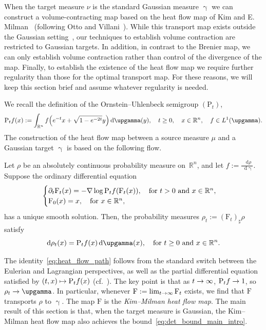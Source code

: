 \documentclass[10pt]{amsart}
\theoremstyle{definition}\newtheorem{defi}[theo]{Definition}\newtheorem{rema}[theo]{Remark}\newtheorem{exam}[theo]{Example}\newtheorem{exem}[theo]{Example}\newtheorem{nota}[theo]{Notation}
\newcommand{\R}{\mathbb R}
\newcommand{\Pheat}{\mathrm{P}}
\newcommand{\KM}{\mathrm F}
\newcommand{\dd}{n}
\newcommand{\density}{f}
\newcommand{\prob}{\rho}
\newcommand{\source}{\mu}
\newcommand{\target}{\nu}
\newcommand*\diff{\mathop{}\!\mathrm{d}}
\newcommand{\Gaussian}{\upgamma}
\renewcommand*{\to}{\mathchoice{\longrightarrow}{\rightarrow}{\rightarrow}{\rightarrow}}
\let\oldmapsto\mapsto
\renewcommand*{\mapsto}{\mathchoice{\longmapsto}{\oldmapsto}{\oldmapsto}{\oldmapsto}}
\let\originalleft\left
\let\originalright\right
\renewcommand{\left}{\mathopen{}\mathclose\bgroup\originalleft}
\renewcommand{\right}{\aftergroup\egroup\originalright}
\let\oldin\in
\renewcommand{\in}{\mathchoice{\oldin}{\oldin}{\,\oldin\,}{\,\oldin\,}}
\begin{document}
When the target measure $\target$ is the standard Gaussian measure $\Gaussian$ we can construct a volume-contracting map based on the heat flow map of Kim and E. Milman~\cite{MR2983070} (following Otto and Villani~\cite{MR1760620}). While this transport map exists outside the Gaussian setting~\cite{MR2983070,MR4707029}, our techniques to establish volume contraction are restricted to Gaussian targets. In addition, in contrast to the Brenier map, we can only establish volume contraction rather than control of the divergence of the map. Finally, to establish the existence of the heat flow map we require further regularity than those for the optimal transport map. For these reasons, we will keep this section brief and assume whatever regularity is needed.

We recall the definition of the Ornstein--Uhlenbeck semigroup $(\Pheat_t)$,
\begin{equation}\label{eq:OU_def}
\Pheat_t\density(x):=\int_{\R^{\dd}} \density\left(e^{-t}x+\sqrt{1-e^{-2t}}y\right)\diff \Gaussian(y),\quad t\ge 0,\quad x\in \R^{\dd}, \quad \density \in L^1(\Gaussian).
\end{equation}
The construction of the heat flow map between a source measure $\source$ and a Gaussian target $\Gaussian$ is based on the following flow.
\begin{prop}\label{prop:KM_construction}
Let $\prob$ be an absolutely continuous probability measure on~$\R^{\dd}$, and let $\density:=\frac{\diff\prob}{\diff\Gaussian}$. Suppose the ordinary differential equation
\begin{equation}\label{eq:KM_construction}
\begin{cases}
\partial_t\KM_t(x)=-\nabla\log\Pheat_t\density(\KM_t(x)),\quad \text{for}~t>0 \text{ and } x\in \R^{\dd}, \\
\KM_0(x)=x,\quad \text{for}~x\in \R^{\dd},
\end{cases}
\end{equation}
has a unique smooth solution. Then, the probability measures $\prob_t:=(\KM_t)_{\sharp}\prob$ satisfy
\begin{equation}\label{eq:heat_flow_path}
\diff\prob_t(x)=\Pheat_t \density(x)\diff\Gaussian(x),\quad\text{for } t\ge 0 \text{ and } x\in \R^{\dd}.
\end{equation}
\end{prop}

The identity~\eqref{eq:heat_flow_path} follows from the standard switch between the Eulerian and Lagrangian perspectives, as well as the partial differential equation satisfied by $(t,x)\mapsto \Pheat_t \density(x)$ (cf.~\cite[\S 1.2]{MR2983070}). The key point is that as $t\to\infty$, $\Pheat_t \density\to 1$, so $\prob_t\to \Gaussian$. In particular, whenever $\KM:=\lim_{t\to\infty}\KM_t$ exists, we find that $\KM$ transports $\prob$ to $\Gaussian$. The map $\KM$ is the \emph{Kim--Milman heat flow map}. The main result of this section is that, when the target measure is Gaussian, the Kim--Milman heat flow map also achieves the bound~\eqref{eq:det_bound_main_intro}.
\end{document}
